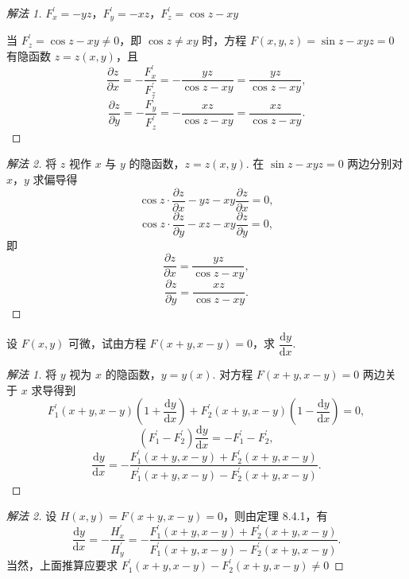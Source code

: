 \begin{proof}[解法 1]
$F_{x}^{\prime} = -yz$，$F_{y}^{\prime} = -xz$，$F_{z}^{\prime} = \cos z - xy$

当 $F_{z}^{\prime} = \cos z - xy \neq 0$，即 $\cos z \neq xy$ 时，方程 $F(x,y,z) = \sin z - xyz = 0$ 有隐函数 $z = z(x,y)$，且
\[
  \frac{\partial z}{\partial x} = -\frac{F_{x}^{\prime}}{F_{z}^{\prime}} = -\frac{yz}{\cos z - xy} = \frac{yz}{\cos z - xy},
\]
\[
  \frac{\partial z}{\partial y} = -\frac{F_{y}^{\prime}}{F_{z}^{\prime}} = -\frac{xz}{\cos z - xy} = \frac{xz}{\cos z - xy}.
\]
\end{proof}

\begin{proof}[解法 2]
将 $z$ 视作 $x$ 与 $y$ 的隐函数，$z = z(x,y)$. 在 $\sin z - xyz = 0$ 两边分别对 $x$，$y$ 求偏导得
\[
  \cos z \cdot \frac{\partial z}{\partial x} - yz - xy \frac{\partial z}{\partial x} = 0,
\]
\[
  \cos z \cdot \frac{\partial z}{\partial y} - xz - xy \frac{\partial z}{\partial y} = 0,
\]
即
\[
  \frac{\partial z}{\partial x} = \frac{yz}{\cos z - xy},
\]
\[
  \frac{\partial z}{\partial y} = \frac{xz}{\cos z - xy}.
\]
\end{proof}

\begin{example}\label{ex:8.4.7}
设 $F(x,y)$ 可微，试由方程 $F(x+y,x-y) = 0$，求 $\dfrac{\mathrm{d}y}{\mathrm{d}x}$.
\end{example}

\begin{proof}[解法 1]
将 $y$ 视为 $x$ 的隐函数，$y = y(x)$. 对方程 $F(x+y,x-y) = 0$ 两边关于 $x$ 求导得到
\[
  F_{1}^{\prime}(x+y,x-y)\left(1 + \frac{\mathrm{d}y}{\mathrm{d}x}\right) + F_{2}^{\prime}(x+y,x-y)\left(1 - \frac{\mathrm{d}y}{\mathrm{d}x}\right) = 0,
\]
\[
  \left(F_{1}^{\prime} - F_{2}^{\prime}\right)\frac{\mathrm{d}y}{\mathrm{d}x} = -F_{1}^{\prime} - F_{2}^{\prime},
\]
\[
  \frac{\mathrm{d}y}{\mathrm{d}x} = -\frac{F_{1}^{\prime}(x+y,x-y) + F_{2}^{\prime}(x+y,x-y)}{F_{1}^{\prime}(x+y,x-y) - F_{2}^{\prime}(x+y,x-y)}.
\]
\end{proof}

\begin{proof}[解法 2]
设 $H(x,y) = F(x+y,x-y) = 0$，则由定理 8.4.1，有
\[
  \frac{\mathrm{d}y}{\mathrm{d}x} = -\frac{H_{x}^{\prime}}{H_{y}^{\prime}} = -\frac{F_{1}^{\prime}(x+y,x-y) + F_{2}^{\prime}(x+y,x-y)}{F_{1}^{\prime}(x+y,x-y) - F_{2}^{\prime}(x+y,x-y)}.
\]
当然，上面推算应要求 $F_{1}^{\prime}(x+y,x-y) - F_{2}^{\prime}(x+y,x-y) \neq 0$
\end{proof}

